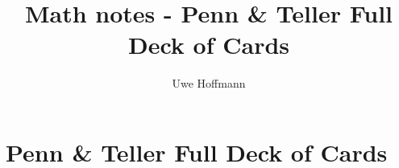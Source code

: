 

\title{Math notes - Penn \& Teller Full Deck of Cards}
\author{Uwe Hoffmann}




\setcounter{chapter}{0}
\chapter{Penn \& Teller Full Deck of Cards}
